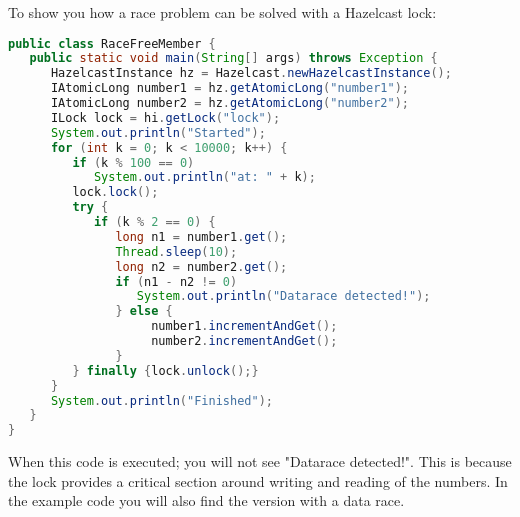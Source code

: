 To show you how a race problem can be solved with a Hazelcast lock:
\begin{lstlisting}[language=java]
public class RaceFreeMember {
   public static void main(String[] args) throws Exception {
      HazelcastInstance hz = Hazelcast.newHazelcastInstance();
      IAtomicLong number1 = hz.getAtomicLong("number1");
      IAtomicLong number2 = hz.getAtomicLong("number2");
      ILock lock = hi.getLock("lock");
      System.out.println("Started");
      for (int k = 0; k < 10000; k++) {
         if (k % 100 == 0) 
            System.out.println("at: " + k);
         lock.lock();
         try {
            if (k % 2 == 0) {
               long n1 = number1.get();
               Thread.sleep(10);
               long n2 = number2.get();
               if (n1 - n2 != 0) 
                  System.out.println("Datarace detected!");
               } else {
                    number1.incrementAndGet();
                    number2.incrementAndGet();
               }
         } finally {lock.unlock();}
      }
      System.out.println("Finished");
   }
}
\end{lstlisting}
When this code is executed; you will not see "Datarace detected!". This is because the lock provides a critical section around writing and reading of the numbers. In the example code you will also find the version with a data race.


